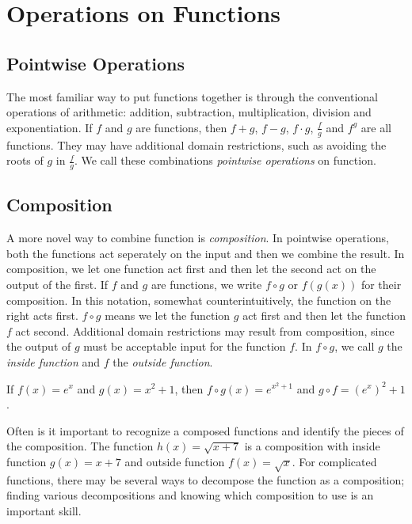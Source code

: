 \documentclass[fleqn]{report}
\begin{document}
\chapter{Operations on Functions}
\label{Operations on Functions}

\section*{Pointwise Operations}

The most familiar way to put functions together is through the
conventional operations of arithmetic: addition, subtraction,
multiplication, division and exponentiation. If $f$ and $g$
are functions, then $f+g$, $f-g$, $f \cdot g$, $\frac{f}{g}$
and $f^g$ are all functions. They may have additional domain
restrictions, such as avoiding the roots of $g$ in
$\frac{f}{g}$. We call these combinations \emph{pointwise
operations} on function. 

\section*{Composition}

A more novel way to combine function is \emph{composition}.
In pointwise operations, both the functions act seperately on
the input and then we combine the result. In composition, we
let one function act first and then let the second act on the
output of the first. If $f$ and $g$ are functions, we write
$f \circ g$ or $f(g(x))$ for their composition. In this
notation, somewhat counterintuitively, the function on the
right acts first. $f \circ g$ means we let the function $g$
act first and then let the function $f$ act second. Additional
domain restrictions may result from composition, since the
output of $g$ must be acceptable input for the function $f$.
In $f \circ g$, we call $g$ the \emph{inside function} and $f$
the \emph{outside function}.

\begin{example}
If $f(x) = e^x$ and $g(x) = x^2+1$, then
$f \circ g (x) = e^{x^2+1}$ and $g \circ f = (e^x)^2
+1$. 
\end{example}

\begin{example}
Often is it important to recognize a composed functions and
identify the pieces of the composition. 
The function $h(x) = \sqrt{x+7}$ is a composition with inside
function $g(x) = x+7$ and outside function $f(x) = \sqrt{x}$.
For complicated functions, there may be several ways to
decompose the function as a composition; finding various
decompositions and knowing which composition to use is an
important skill.
\end{example}
\end{document}
